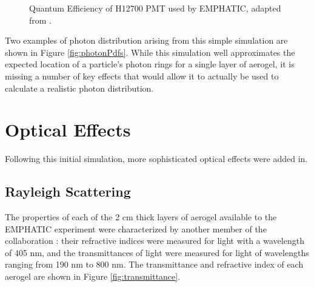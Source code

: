 \begin{figure}[]
\centering
{}
\caption[Quantum Efficiency of H12700 PMT used by EMPHATIC.]{Quantum Efficiency of H12700 PMT used by EMPHATIC, adapted from \cite{H12700}.}
\label{fig:qEff} 
\end{figure}

Two examples of photon distribution arising from this simple simulation are shown in Figure \ref{fig:photonPdfs}. While this simulation well approximates the expected location of a particle's photon rings for a single layer of aerogel, it is missing a number of key effects that would allow it to actually be used to calculate a realistic photon distribution.

\section{Optical Effects}
Following this initial simulation, more sophisticated optical effects were added in. 

\subsection{Rayleigh Scattering}
The properties of each of the 2 cm thick layers of aerogel available to the EMPHATIC experiment were characterized by another member of the collaboration \cite{aerogelTabata}: their refractive indices were measured for light with a wavelength of 405 nm, and the transmittances of light were measured for light of wavelengths ranging from 190 nm to 800 nm.
The transmittance and refractive index of each aerogel are shown in Figure \ref{fig:transmittance}.


